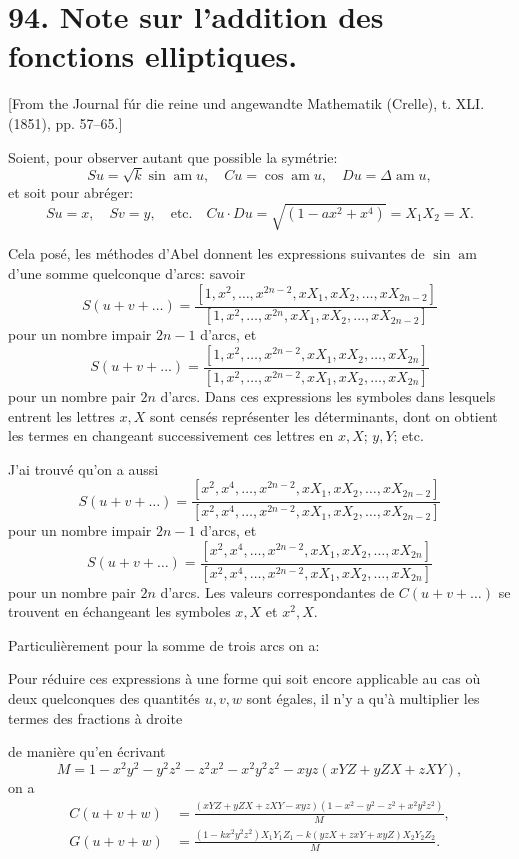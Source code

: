 \documentclass[11pt,a4paper]{book}
\begin{document}
\newpage

\section*{94. Note sur l'addition des fonctions elliptiques.}

[From the Journal f\'{u}r die reine und angewandte Mathematik (Crelle), t. XLI. (1851), pp. 57--65.]

Soient, pour observer autant que possible la sym\'{e}trie:
\[
Su = \sqrt{k} \sin \operatorname{am} u, \quad Cu = \cos \operatorname{am} u, \quad Du = \Delta \operatorname{am} u,
\]
et soit pour abr\'{e}ger:
\[
Su = x, \quad Sv = y, \quad \text{etc.} \quad Cu \cdot Du = \sqrt{(1 - ax^2 + x^4)} = X_1 X_2 = X.
\]

Cela pos\'{e}, les m\'{e}thodes d'Abel donnent les expressions suivantes de $\sin \operatorname{am}$ d'une somme quelconque d'arcs: savoir
\[
S(u + v + \ldots) = \frac{[1, x^2, \ldots, x^{2n-2}, xX_1, xX_2, \ldots, xX_{2n-2}]}{[1, x^2, \ldots, x^{2n}, xX_1, xX_2, \ldots, xX_{2n-2}]}
\]
pour un nombre impair $2n-1$ d'arcs, et
\[
S(u + v + \ldots) = \frac{[1, x^2, \ldots, x^{2n-2}, xX_1, xX_2, \ldots, xX_{2n}]}{[1, x^2, \ldots, x^{2n-2}, xX_1, xX_2, \ldots, xX_{2n}]}
\]
pour un nombre pair $2n$ d'arcs. Dans ces expressions les symboles dans lesquels entrent les lettres $x, X$ sont cens\'{e}s repr\'{e}senter les d\'{e}terminants, dont on obtient les termes en changeant successivement ces lettres en $x, X$; $y, Y$; etc.

J'ai trouv\'{e} qu'on a aussi
\[
S(u + v + \ldots) = \frac{[x^2, x^4, \ldots, x^{2n-2}, xX_1, xX_2, \ldots, xX_{2n-2}]}{[x^2, x^4, \ldots, x^{2n-2}, xX_1, xX_2, \ldots, xX_{2n-2}]}
\]
pour un nombre impair $2n-1$ d'arcs, et
\[
S(u + v + \ldots) = \frac{[x^2, x^4, \ldots, x^{2n-2}, xX_1, xX_2, \ldots, xX_{2n}]}{[x^2, x^4, \ldots, x^{2n-2}, xX_1, xX_2, \ldots, xX_{2n}]}
\]
pour un nombre pair $2n$ d'arcs. Les valeurs correspondantes de $C(u + v + \ldots)$ se trouvent en \'{e}changeant les symboles $x, X$ et $x^2, X$.

Particuli\`{e}rement pour la somme de trois arcs on a:

Pour r\'{e}duire ces expressions \`{a} une forme qui soit encore applicable au cas o\`{u} deux quelconques des quantit\'{e}s $u, v, w$ sont \'{e}gales, il n'y a qu'\`{a} multiplier les termes des fractions \`{a} droite


de mani\`{e}re qu'en \'{e}crivant
\[
M = 1 - x^2y^2 - y^2z^2 - z^2x^2 - x^2y^2z^2 - xyz(xYZ + yZX + zXY),
\]
on a
\begin{align*}
C(u + v + w) &= \frac{(xYZ + yZX + zXY - xyz)(1 - x^2 - y^2 - z^2 + x^2y^2z^2)}{M}, \\
G(u + v + w) &= \frac{(1 - kx^2y^2z^2)X_1Y_1Z_1 - k(yzX + zxY + xyZ)X_2Y_2Z_2}{M}.
\end{align*}
\end{document}
